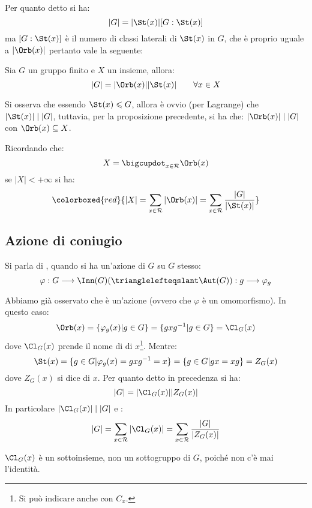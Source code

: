 \documentclass[11pt]{scrartcl}
\begin{document}
Per quanto detto si ha:
    \[ |G| = |\St(x)| [G : \St(x)]
        \]
ma $[G : \St(x)]$ è il numero di classi laterali di $\St(x)$ in $G$, che è proprio uguale a $|\Orb(x)|$ pertanto vale la seguente:

\begin{proposition}
    \label{p:1.25}
    Sia $G$ un gruppo finito e $X$ un insieme, allora:
        \[ |G| = |\Orb(x)||\St(x)|
            \qquad \forall x \in X
            \]
\end{proposition}

\begin{remark}
    Si osserva che essendo $\St(x) \leqslant G$, allora è ovvio (per Lagrange) che $|\St(x)| \mid |G|$, tuttavia, per la proposizione precedente, si ha che:
    $|\Orb(x)| \mid |G| $ con $\Orb(x) \subseteq X$.
\end{remark}

\pagebreak
Ricordando che:
    \[ X = \bigcupdot_{x \in \mathcal R} \Orb(x)
        \]
se $|X|<+\infty$ si ha:
    \[ \colorboxed{red}{
        |X| = \sum_{x \in \mathcal{R}} |\Orb(x)| = \sum_{x \in \mathcal{R}} \frac{|G|}{|\St(x)|}
    }\]


\newpage
\subsection{Azione di coniugio}
\begin{definition}
    Si parla di , quando si ha un'azione di $G$ su $G$ stesso:
        \[ \varphi : G \longrightarrow \Inn(G) (\trianglelefteqslant \Aut(G)) : g \longrightarrow \varphi_g
            \]
\end{definition}

Abbiamo già osservato che è un'azione (ovvero che $\varphi$ è un omomorfismo). In questo caso:
    \[ \Orb(x) = \{\varphi_g(x) | g \in G\} = \{ gxg^{-1} | g \in G\} = \Cl_G(x)
        \]
dove $\Cl_G(x)$ prende il nome di  di $x$\footnote{Si può indicare anche con $C_x$.}. Mentre:
    \[ \St(x) = \{g \in G | \varphi_g(x) = gxg^{-1} = x\} = \{g \in G | gx = xg\} = Z_G(x)
        \]
dove $Z_G(x)$ si dice  di $x$. Per quanto detto in precedenza si ha:
    \[ |G| = |\Cl_G(x)||Z_G(x)|
        \]
In particolare $|\Cl_G(x)| \mid |G|$ e :
    \[ |G| = \sum_{x \in \mathcal{R}} |\Cl_G(x)| = \sum_{x \in \mathcal{R}} \frac{|G|}{|Z_G(x)|}
        \]

\begin{remark}
    $\Cl_G(x)$ è un sottoinsieme, non un sottogruppo di $G$, poiché non c'è mai l'identità.
\end{remark}
\end{document}
